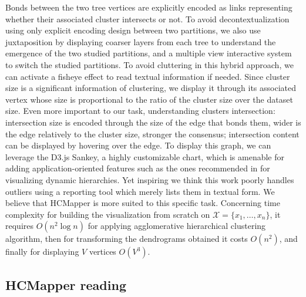 \documentclass[10pt,conference,a4paper]{IEEEtran}
\begin{document}
Bonds between the two tree vertices are explicitly encoded as links representing whether their associated cluster intersects or not. To avoid decontextualization using only explicit encoding design between two partitions, we also use juxtaposition by displaying coarser layers from each tree to understand the emergence of the two studied partitions, and a multiple view interactive system to switch the studied partitions. To avoid cluttering in this hybrid approach, we can activate a fisheye effect to read textual information if needed. Since cluster size is a significant information of clustering, we display it through its associated vertex whose size is proportional to the ratio of the cluster size over the dataset size. Even more important to our task, understanding clusters intersection: intersection size is encoded through the size of the edge that bonds them, wider is the edge relatively to the cluster size, stronger the consensus; intersection content can be displayed by hovering over the edge. To display this graph, we can leverage the D3.js \cite{bostock2011d3} Sankey, a highly customizable chart, which is amenable for adding application-oriented features such as the ones recommended in \cite{guerra2013visualizing} for visualizing dynamic hierarchies. Yet inspiring we think this work poorly handles outliers using a reporting tool which merely lists them in textual form. We believe that HCMapper is more suited to this specific task.
Concerning time complexity for building the visualization from scratch on $\mathcal{X} = \{x_1,\ldots,x_n\}$, it requires $O(n^2 \log n)$ for applying agglomerative hierarchical clustering algorithm, then for transforming the dendrograms obtained it costs $O(n^2)$, and finally for displaying $V$ vertices $O(V^3)$. 

\subsection{HCMapper reading}
\end{document}
